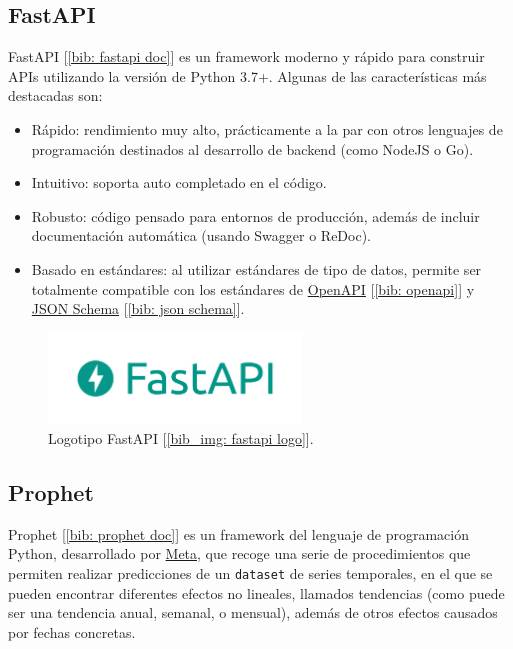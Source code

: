 \documentclass[a4paper, oneside, 12pt]{book}
\begin{document}
	\subsection{FastAPI}
	\label{sec: fastapi}
	
	\noindent FastAPI [\ref{bib: fastapi doc}] es un framework moderno y rápido para construir APIs utilizando la versión de Python 3.7+. Algunas de las características más destacadas son:
	
	\begin{itemize}
		\item Rápido: rendimiento muy alto, prácticamente a la par con otros lenguajes de programación destinados al desarrollo de backend (como NodeJS o Go).
		\item Intuitivo: soporta auto completado en el código.
		\item Robusto: código pensado para entornos de producción, además de incluir documentación automática (usando Swagger o ReDoc).
		\item Basado en estándares: al utilizar estándares de tipo de datos, permite ser totalmente compatible con los estándares de \href{https://github.com/OAI/OpenAPI-Specification}{OpenAPI} [\ref{bib: openapi}] y \href{https://json-schema.org/}{JSON Schema} [\ref{bib: json schema}].
	\end{itemize}
	
	\pagebreak
	
	\begin{figure}[h!]
		\begin{center}
			\includegraphics[width=0.6\textwidth]{img/fastapi_logo.png}
			\caption{Logotipo FastAPI [\ref{bib_img: fastapi logo}].}
			\label{img: fastapi logo}
		\end{center}
	\end{figure}

	\subsection{Prophet}
	\label{sec: prophet}
	
	\noindent Prophet [\ref{bib: prophet doc}] es un framework del lenguaje de programación Python, desarrollado por \href{https://github.com/facebook/}{Meta}, que recoge una serie de procedimientos que permiten realizar predicciones de un \texttt{dataset} de series temporales, en el que se pueden encontrar diferentes efectos no lineales, llamados tendencias (como puede ser una tendencia anual, semanal, o mensual), además de otros efectos causados por fechas concretas. \\
	
\end{document}
